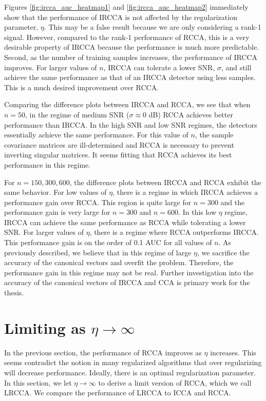 Figures \ref{fig:ircca_auc_heatmap1} and \ref{fig:ircca_auc_heatmap2} immediately show
that the performance of IRCCA is not affected by the regularization parameter,
$\eta$. This may be a false result because we are only considering a rank-1
signal. However, compared to the rank-1 performance of RCCA, this is a very desirable
property of IRCCA because the performance is much more predictable. Second, as the
number of training samples increases, the performance of IRCCA improves. For larger values
of $n$, IRCCA can tolerate a lower SNR, $\sigma$, and still achieve the same performance
as that of an IRCCA detector using less samples. This is a much desired improvement over
RCCA.

Comparing the difference plots between IRCCA and RCCA, we see that when $n=50$, in the
regime of medium SNR ($\sigma\approx 0$ dB) RCCA achieves better performance than
IRCCA. In the high SNR and low SNR regimes, the detectors essentially achieve the same
performance. For this value of $n$, the sample covariance matrices are ill-determined and
RCCA is necessary to prevent inverting singular matrices. It seems fitting that RCCA
achieves its best performance in this regime. 

For $n=150,300,600$, the difference plots between IRCCA and RCCA exhibit the same
behavior. For low values of $\eta$, there is a regime in which IRCCA achieves a
performance gain over RCCA. This region is quite large for $n=300$ and the performance
gain is very large for $n=300$ and $n=600$. In this low $\eta$ regime, IRCCA can achieve
the same performance as RCCA while tolerating a lower SNR. For larger values of $\eta$,
there is a regime where RCCA outperforms IRCCA. This performance gain is on the order of
0.1 AUC for all values of $n$. As previously described, we believe that in this regime of
large $\eta$, we sacrifice the accuracy of the canonical vectors and overfit the
problem. Therefore, the performance gain in this regime may not be real. Further
investigation into the accuracy of the canonical vectors of IRCCA and CCA is primary work
for the thesis.

\section{Limiting as $\eta\to\infty$}

In the previous section, the performance of RCCA improves as $\eta$ increases. This seems
contradict the notion in many regularized algorithms that over regularizing will decrease
performance. Ideally, there is an optimal regularization parameter. In this section, we let
$\eta\to\infty$ to derive a limit version of RCCA, which we call LRCCA. We compare the
performance of LRCCA to ICCA and RCCA. 

